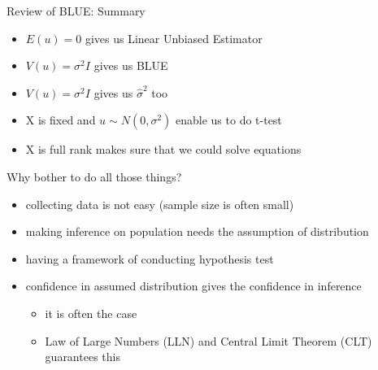 \documentclass[aspectratio=169, t]{beamer}
\begin{document}
\begin{frame}{Review of BLUE: Summary}
    \begin{itemize}
        \item $E(u) = 0$ gives us Linear Unbiased Estimator
        \item $V(u) = \sigma^2 I$ gives us BLUE
        \item $V(u) = \sigma^2 I$ gives us $\hat{\sigma}^2$ too
        \item X is fixed and $u \sim N(0, \sigma^2)$ enable us to do t-test
        \item X is full rank makes sure that we could solve equations  
    \end{itemize}
    Why bother to do all those things? 
    \begin{itemize}
        \item collecting data is not easy (sample size is often small)
        \item making inference on population needs the assumption of distribution 
        \item having a framework of conducting hypothesis test
        \item confidence in assumed distribution gives the confidence in inference
        \begin{itemize}
            \item it is often the case
            \item Law of Large Numbers (LLN) and Central Limit Theorem (CLT) guarantees this 
        \end{itemize}
    \end{itemize}
\end{frame}
\end{document}
